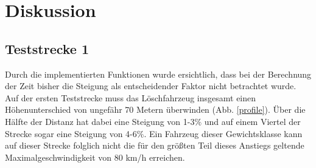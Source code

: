 \section{Diskussion}

\subsection{Teststrecke 1}

Durch die implementierten Funktionen wurde ersichtlich, dass bei der Berechnung der Zeit bisher die Steigung als entscheidender Faktor nicht betrachtet wurde.
Auf der ersten Teststrecke muss das Löschfahrzeug insgesamt einen Höhenunterschied von ungefähr 70 Metern überwinden (Abb. \ref{profile}).
Über die Hälfte der Distanz hat dabei eine Steigung von 1-3$\%$ und auf einem Viertel der Strecke sogar eine Steigung von 4-6$\%$.
Ein Fahrzeug dieser Gewichtsklasse kann auf dieser Strecke folglich nicht die für den größten Teil dieses Anstiegs geltende Maximalgeschwindigkeit von 80 km/h erreichen.



